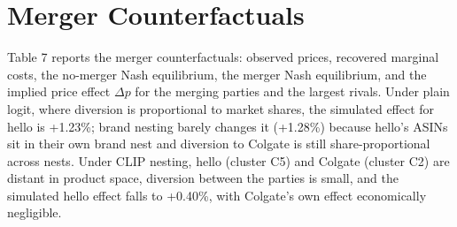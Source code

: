 \section{Merger Counterfactuals}\label{merger-counterfactuals}

Table 7 reports the merger counterfactuals: observed prices, recovered
marginal costs, the no-merger Nash equilibrium, the merger Nash
equilibrium, and the implied price effect \(\Delta p\) for the merging
parties and the largest rivals. Under plain logit, where diversion is
proportional to market shares, the simulated effect for hello is
+1.23\%; brand nesting barely changes it (+1.28\%) because hello's ASINs
sit in their own brand nest and diversion to Colgate is still
share-proportional across nests. Under CLIP nesting, hello (cluster C5)
and Colgate (cluster C2) are distant in product space, diversion between
the parties is small, and the simulated hello effect falls to +0.40\%,
with Colgate's own effect economically negligible.

